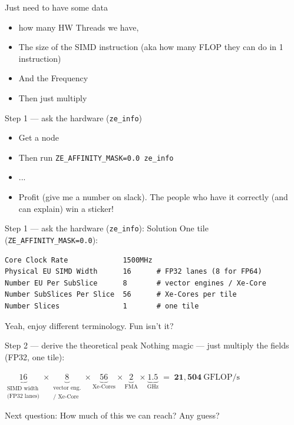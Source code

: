 \begin{frame}{Just need to have some data}

\begin{itemize}
    \item  how many HW Threads we have,
    \item  The size of the SIMD instruction (aka how many FLOP they can do in 1 instruction)
    \item And the Frequency
    \item Then just multiply
\end{itemize}

\end{frame}

\begin{frame}[fragile]{Step 1 --- ask the hardware (\texttt{ze\_info})}
\begin{itemize}
    \item Get a node
    \item Then run \texttt{ZE_AFFINITY_MASK=0.0 ze_info}
    \item ...
    \item  Profit (give me a number on slack). The people who have it correctly (and can explain) win a sticker!
\end{itemize}

\end{frame}
\begin{frame}[fragile]{Step 1 --- ask the hardware (\texttt{ze\_info}): Solution}
One tile (\texttt{ZE\_AFFINITY\_MASK=0.0}):
\begin{verbatim}
Core Clock Rate             1500MHz
Physical EU SIMD Width      16      # FP32 lanes (8 for FP64)
Number EU Per SubSlice      8       # vector engines / Xe-Core
Number SubSlices Per Slice  56      # Xe-Cores per tile
Number Slices               1       # one tile
\end{verbatim}

Yeah, enjoy different terminology. Fun isn't it?
\end{frame}

\begin{frame}{Step 2 --- derive the theoretical peak}
Nothing magic --- just multiply the fields (FP32, one tile):
\medskip
\begin{center}
\small
$\underbrace{16}_{\substack{\text{SIMD width}\\ \text{(FP32 lanes)}}}
 \times \underbrace{8}_{\substack{\text{vector eng.}\\ \text{/ Xe-Core}}}
 \times \underbrace{56}_{\text{Xe-Cores}}
 \times \underbrace{2}_{\text{FMA}}
 \times \underbrace{1.5}_{\text{GHz}}
 \;=\; \mathbf{21{,}504}\ \text{GFLOP/s}$
\end{center}

Next question: How much of this we can reach? Any guess?
\end{frame}

